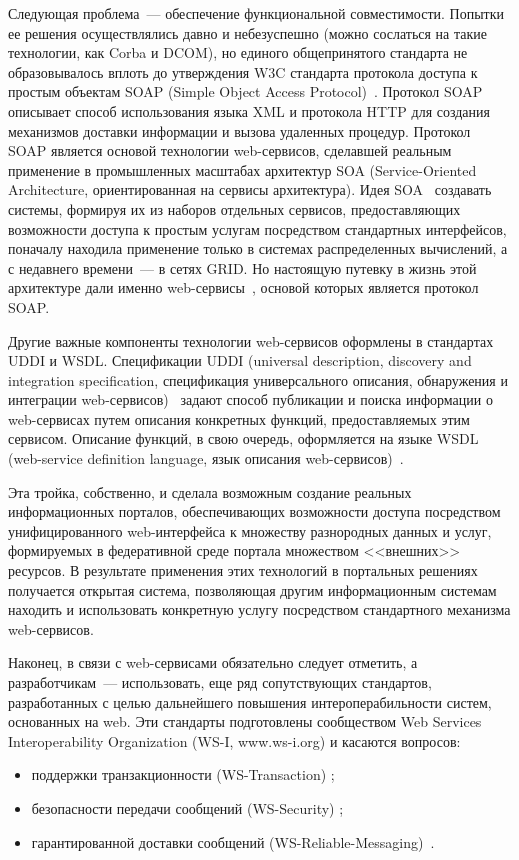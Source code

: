 \begin{multicols}{2}
Следующая проблема~--- обеспечение функциональной совместимости. Попытки ее
решения осуществлялись давно и небезуспешно (можно сослаться на такие технологии,
как Corba и DCOM), но единого общепринятого стандарта не образовывалось вплоть до
утверждения W3C стандарта протокола доступа к простым объектам SOAP 
(Simple Object Access Protocol)~\cite{8bos}. 
Протокол SOAP описывает способ
использования языка XML и протокола HTTP для создания механизмов доставки
информации и вызова удаленных процедур. Протокол SOAP является основой технологии 
web-сервисов, сделавшей реальным применение в промышленных масштабах архитектур SOA
(Service-Oriented Architecture, ориентированная на сервисы архитектура). Идея
SOA~\cite{9bos} создавать системы, формируя их из наборов отдельных сервисов,
предо\-став\-ля\-ющих возможности доступа к простым услугам посредством стандартных
интерфейсов, поначалу находила применение только в системах распределенных
вы\-чис\-ле\-ний, а с недавнего времени~--- в сетях GRID. Но настоящую путевку в жизнь этой
архитектуре дали именно web-сервисы~\cite{10bos}, основой которых является протокол
SOAP.

Другие важные компоненты технологии web-сервисов оформлены в стандартах UDDI и
WSDL. Спецификации UDDI (universal description, discovery and integration specification,
спецификация универсального описания, обнаружения и интеграции 
web-сервисов)~\cite{11bos} задают способ публикации и поиска информации о web-сервисах
путем описания конкретных функций, предоставляемых этим сервисом. Описание
функций, в свою очередь, оформляется на языке WSDL (web-service definition language,
язык описания web-сервисов)~\cite{12bos}.

Эта тройка, собственно, и сделала возможным создание реальных информационных
порталов, обеспечивающих возможности доступа посредством унифицированного
web-интерфейса к множеству разнородных данных и услуг, формируемых в федеративной
среде портала множеством <<внешних>> ресурсов. В результате применения этих
технологий в портальных решениях получается открытая система, позволяющая другим
информационным системам находить и использовать конкретную услугу посредством
стандартного механизма web-сервисов.

Наконец, в связи с web-сервисами обязательно следует отметить, а разработчикам~---
использовать, еще ряд сопутствующих стандартов, разработанных с целью дальнейшего
повышения интероперабильности систем, основанных на web. Эти стандарты
подготовлены сообществом Web Services Interoperability Organization (WS-I,
{\sf www.ws-i.org}) и касаются вопросов:
\begin{itemize}
\item поддержки транзакционности (WS-Trans\-action) \cite{13bos};
\item безопасности передачи сообщений (WS-Security) \cite{14bos};
\item гарантированной доставки сообщений (WS-Reliable-Messaging)~\cite{15bos}.
\end{itemize}


\end{multicols}
